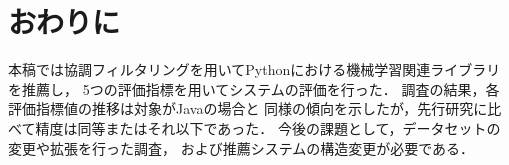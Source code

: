 \section{おわりに\label{conclusion}}
  本稿では協調フィルタリングを用いてPythonにおける機械学習関連ライブラリを推薦し，
  5つの評価指標を用いてシステムの評価を行った．
  調査の結果，各評価指標値の推移は対象がJavaの場合と
  同様の傾向を示したが，先行研究に比べて精度は同等またはそれ以下であった．
  今後の課題として，データセットの変更や拡張を行った調査，
  および推薦システムの構造変更が必要である．
  
